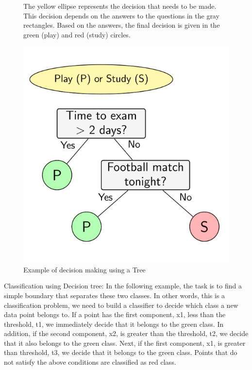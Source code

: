\begin{figure}[H]
	\begin{minipage}[T]{0.45\textwidth}
		\raggedright
		The yellow ellipse represents the decision that needs to be made. This decision depends on the answers to the questions in the gray rectangles. Based on the answers, the final decision is given in the green (play) and red (study) circles.
	\end{minipage}
	\hfill
	\begin{minipage}[T]{0.4\textwidth}
		\centering
		\includegraphics[width=\linewidth]{figures/decision-tree-ex1}
		\caption{Example of decision making using a Tree}
	\end{minipage}
\end{figure}

{\large Classification using Decision tree:} In the following example, the task is to find a simple boundary that separates these two classes. In other words, this is a classification problem, we need to build a classifier to decide which class a new data point belongs to. If a point has the first component, x1, less than the threshold, t1, we immediately decide that it belongs to the green class. In addition, if the second component, x2, is greater than the threshold, t2, we decide that it also belongs to the green class. Next, if the first component, x1, is greater than threshold, t3, we decide that it belongs to the green class. Points that do not satisfy the above conditions are classified as red class.

